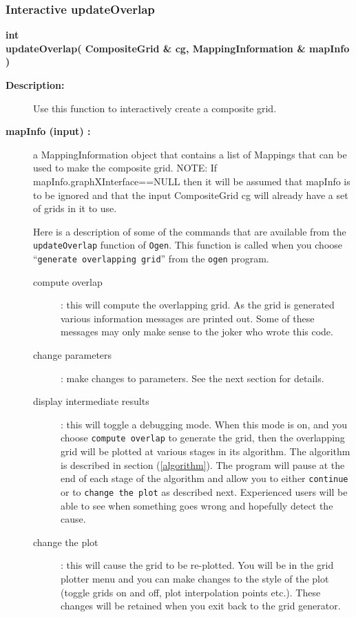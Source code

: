 \subsubsection{Interactive updateOverlap}
 
\newlength{\ogenUpdateIncludeArgIndent}
\begin{flushleft} \textbf{%
int  \\ 
\settowidth{\ogenUpdateIncludeArgIndent}{updateOverlap(}%
updateOverlap( CompositeGrid \& cg, MappingInformation \& mapInfo )
}\end{flushleft}
  
\begin{description}
\item[{\bf Description:}] 
   Use this function to interactively create a composite grid.

\item[{\bf mapInfo (input) :}]  a MappingInformation object that contains a list of
   Mappings that can be used to make the composite grid. NOTE: If mapInfo.graphXInterface==NULL
   then it will be assumed that mapInfo is to be ignored and that 
   the input CompositeGrid cg will already have a set of grids in it to use.


 Here is a description of some of the commands that are available from the
 {\tt updateOverlap} function of {\tt Ogen}. This function is called when you 
 choose ``{\tt generate overlapping grid}'' from the {\tt ogen} program.
 
 \begin{description}
   \item[compute overlap] : this will compute the overlapping grid. As the grid is generated various
     information messages are printed out. Some of these messages may only make sense to the 
      joker who wrote this code.
   \item[change parameters] : make changes to parameters. See the next section for details.
   \item[display intermediate results] : this will toggle a debugging mode. When this mode
     is on, and you choose {\tt compute overlap} to generate the grid, then the overlapping grid 
     will be plotted at various stages in its algorithm. The algorithm is described in section
     (\ref{algorithm}). The program will pause at the end of each stage of the algorithm and
     allow you to either {\tt continue} or to {\tt change the plot} as described next.
      Experienced users will be able to see when something goes wrong and hopefully detect the cause.
   \item[change the plot] : this will cause the grid to be re-plotted. You will be in the grid plotter
     menu and you can make changes to the style of the plot (toggle grids on and off, plot interpolation
     points etc.). These changes will be retained when you exit back to the grid generator.
 
 \end{description}

\end{description}
